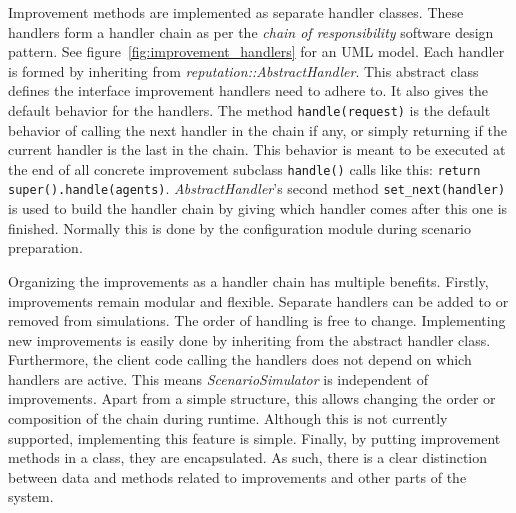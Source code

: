 \documentclass[%
    ]{\PathToTumTemplate/thesis/tum_thesis}
\begin{document}
Improvement methods are implemented as separate handler classes.
These handlers form a handler chain as per the \emph{chain of responsibility} software design pattern.
See figure~\ref{fig:improvement_handlers} for an UML model.
Each handler is formed by inheriting from \emph{reputation::AbstractHandler}.
This abstract class defines the interface improvement handlers need to adhere to.
It also gives the default behavior for the handlers.
The method \texttt{handle(request)} is the default behavior of calling the next handler in the chain if any, or simply returning if the current handler is the last in the chain.
This behavior is meant to be executed at the end of all concrete improvement subclass \texttt{handle()} calls like this: \lstinline{return super().handle(agents)}.
\emph{AbstractHandler}'s second method \texttt{set\_next(handler)} is used to build the handler chain by giving which handler comes after this one is finished.
Normally this is done by the configuration module during scenario preparation.

Organizing the improvements as a handler chain has multiple benefits.
Firstly, improvements remain modular and flexible.
Separate handlers can be added to or removed from simulations.
The order of handling is free to change.
Implementing new improvements is easily done by inheriting from the abstract handler class.
Furthermore, the client code calling the handlers does not depend on which handlers are active.
This means \emph{ScenarioSimulator} is independent of improvements.
Apart from a simple structure, this allows changing the order or composition of the chain during runtime.
Although this is not currently supported, implementing this feature is simple.
Finally, by putting improvement methods in a class, they are encapsulated.
As such, there is a clear distinction between data and methods related to improvements and other parts of the system.
\end{document}
